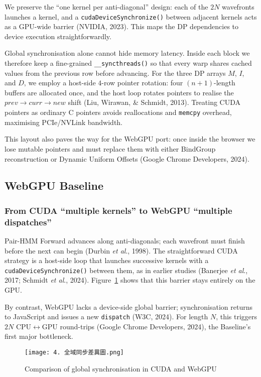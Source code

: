 \documentclass[PhD]{PHlab-thesis}
\begin{document}
We preserve the “one kernel per anti-diagonal” design: each of the $2N$ wavefronts launches a kernel, and a \texttt{cudaDeviceSynchronize()} between adjacent kernels acts as a GPU-wide barrier (NVIDIA, 2023). This maps the DP dependencies to device execution straightforwardly.

Global synchronisation alone cannot hide memory latency. Inside each block we therefore keep a fine-grained \texttt{\_\_syncthreads()} so that every warp shares cached values from the previous row before advancing. For the three DP arrays $M$, $I$, and $D$, we employ a host-side $4$-row pointer rotation: four $(n+1)$-length buffers are allocated once, and the host loop rotates pointers to realise the $\textit{prev}\!\rightarrow\!\textit{curr}\!\rightarrow\!\textit{new}$ shift (Liu, Wirawan, \& Schmidt, 2013). Treating CUDA pointers as ordinary C pointers avoids reallocations and \texttt{memcpy} overhead, maximising PCIe/NVLink bandwidth.

This layout also paves the way for the WebGPU port: once inside the browser we lose mutable pointers and must replace them with either BindGroup reconstruction or Dynamic Uniform Offsets (Google Chrome Developers, 2024).

\subsection{WebGPU Baseline}

\subsubsection{From CUDA “multiple kernels” to WebGPU “multiple dispatches”}
Pair-HMM Forward advances along anti-diagonals; each wavefront must finish before the next can begin (Durbin \emph{et al}., 1998). The straightforward CUDA strategy is a host-side loop that launches successive kernels with a \texttt{cudaDeviceSynchronize()} between them, as in earlier studies (Banerjee \emph{et al}., 2017; Schmidt \emph{et al}., 2024). Figure~\ref{fig:global-sync-diff} shows that this barrier stays entirely on the GPU.

By contrast, WebGPU lacks a device-side global barrier; synchronisation returns to JavaScript and issues a new \texttt{dispatch} (W3C, 2024). For length $N$, this triggers $2N$ CPU$\leftrightarrow$GPU round-trips (Google Chrome Developers, 2024), the Baseline’s first major bottleneck.

\begin{figure}[htbp]
    \centering
    \texttt{[image: 4. 全域同步差異圖.png]}
    \caption{Comparison of global synchronisation in CUDA and WebGPU}
    \label{fig:global-sync-diff}
\end{figure}
\end{document}
